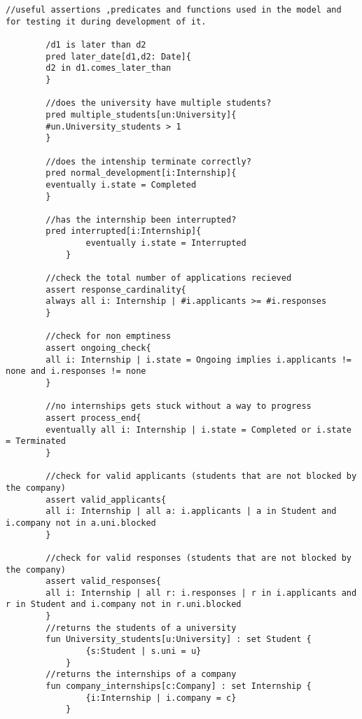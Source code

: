 \begin{lstlisting}[language=Alloy]
        //useful assertions ,predicates and functions used in the model and for testing it during development of it.
        
        /d1 is later than d2
        pred later_date[d1,d2: Date]{
        d2 in d1.comes_later_than
        }
        
        //does the university have multiple students?
        pred multiple_students[un:University]{
        #un.University_students > 1
        }
        
        //does the intenship terminate correctly?
        pred normal_development[i:Internship]{
        eventually i.state = Completed
        }
        
        //has the internship been interrupted?
        pred interrupted[i:Internship]{
                eventually i.state = Interrupted
            }
        
        //check the total number of applications recieved
        assert response_cardinality{
        always all i: Internship | #i.applicants >= #i.responses
        }
        
        //check for non emptiness
        assert ongoing_check{
        all i: Internship | i.state = Ongoing implies i.applicants != none and i.responses != none
        }
        
        //no internships gets stuck without a way to progress
        assert process_end{
        eventually all i: Internship | i.state = Completed or i.state = Terminated
        }
        
        //check for valid applicants (students that are not blocked by the company)
        assert valid_applicants{
        all i: Internship | all a: i.applicants | a in Student and i.company not in a.uni.blocked
        }
        
        //check for valid responses (students that are not blocked by the company)
        assert valid_responses{
        all i: Internship | all r: i.responses | r in i.applicants and r in Student and i.company not in r.uni.blocked
        }
        //returns the students of a university
        fun University_students[u:University] : set Student {
                {s:Student | s.uni = u}
            }
        //returns the internships of a company
        fun company_internships[c:Company] : set Internship {
                {i:Internship | i.company = c}
            }
        
\end{lstlisting}


